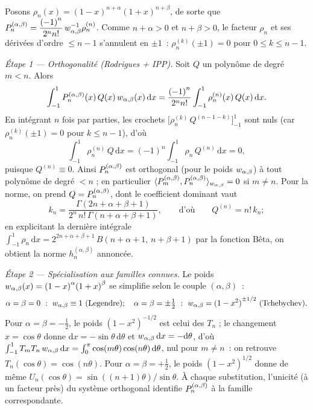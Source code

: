\vspace{10pt}

\begin{mdframed}[style=proofbar]
  Posons $\rho_n(x)={(1-x)}^{n+\alpha}{(1+x)}^{n+\beta}$, de sorte que
  $P_n^{(\alpha,\beta)}=\dfrac{{(-1)}^n}{2^n n!}\,w_{\alpha,\beta}^{-1}\rho_n^{(n)}$. Comme
  $n+\alpha>0$ et $n+\beta>0$, le facteur $\rho_n$ et ses dérivées
  d'ordre $\leq n-1$ s'annulent en $\pm 1$~:
  $\rho_n^{(k)}(\pm 1)=0$ pour $0\leq k\leq n-1$.

  \medskip
  \textit{Étape 1 — Orthogonalité (Rodrigues + IPP).}
  Soit $Q$ un polynôme de degré $m<n$. Alors
  \[
    \int_{-1}^{1}P_n^{(\alpha,\beta)}(x)\,Q(x)\,w_{\alpha,\beta}(x)\,\mathrm{d}x
    = \frac{{(-1)}^n}{2^n n!}\int_{-1}^{1}\rho_n^{(n)}(x)\,Q(x)\,\mathrm{d}x.
  \]
  En intégrant $n$ fois par parties, les crochets
  $\bigl[\rho_n^{(k)}\,Q^{(n-1-k)}\bigr]_{-1}^{1}$ sont nuls (car
  $\rho_n^{(k)}(\pm 1)=0$ pour $k\leq n-1$), d'où
  \[
    \int_{-1}^{1}\rho_n^{(n)}\,Q\,\mathrm{d}x
    = {(-1)}^n\int_{-1}^{1}\rho_n\,Q^{(n)}\,\mathrm{d}x = 0,
  \]
  puisque $Q^{(n)}\equiv 0$. Ainsi $P_n^{(\alpha,\beta)}$ est orthogonal (pour le poids
  $w_{\alpha,\beta}$) à tout polynôme de degré $<n$ ; en particulier
  $\langle P_m^{(\alpha,\beta)},P_n^{(\alpha,\beta)}\rangle_{w_{\alpha,\beta}}=0$ si
  $m\neq n$. Pour la norme, on prend $Q=P_n^{(\alpha,\beta)}$, dont le coefficient dominant
  vaut
  \[
    k_n=\frac{\Gamma(2n+\alpha+\beta+1)}{2^n\,n!\,\Gamma(n+\alpha+\beta+1)},
    \qquad\text{d'où}\qquad Q^{(n)}=n!\,k_n ;
  \]
  en explicitant la dernière intégrale
  $\int_{-1}^1\rho_n\,\mathrm{d}x
  =2^{2n+\alpha+\beta+1}\,B(n+\alpha+1,\,n+\beta+1)$ par la fonction Bêta,
  on obtient la norme $h_n^{(\alpha,\beta)}$ annoncée.

  \medskip
  \textit{Étape 2 — Spécialisation aux familles connues.}
  Le poids $w_{\alpha,\beta}(x)={(1-x)}^\alpha{(1+x)}^\beta$ se simplifie selon le
  couple $(\alpha,\beta)$~:
  \[
    \alpha=\beta=0\ :\ \wab\equiv 1\ \text{(Legendre)} ; \quad
    \alpha=\beta=\pm\tfrac12\ :\ \wab={(1-x^2)}^{\pm 1/2}\ \text{(Tchebychev)}.
  \]
  Pour $\alpha=\beta=-\tfrac12$, le poids ${(1-x^2)}^{-1/2}$ est celui des
  $T_n$ ; le changement $x=\cos\theta$ donne $\mathrm{d}x=-\sin\theta\,
  \mathrm{d}\theta$ et $w_{\alpha,\beta}\,\mathrm{d}x=-\mathrm{d}\theta$, d'où
  $\int_{-1}^1 T_mT_n\,w_{\alpha,\beta}\,\mathrm{d}x=\int_0^\pi\cos(m\theta)\cos(n\theta)
  \,\mathrm{d}\theta$, nul pour $m\neq n$~: on retrouve $T_n(\cos\theta)
  =\cos(n\theta)$. Pour $\alpha=\beta=+\tfrac12$, le poids
  ${(1-x^2)}^{1/2}$ donne de même $U_n(\cos\theta)=\sin((n+1)\theta)/
  \sin\theta$. À chaque substitution, l'unicité (à un facteur près) du
  système orthogonal identifie $P_n^{(\alpha,\beta)}$ à la famille correspondante.


\end{mdframed}
